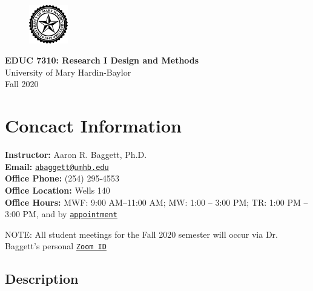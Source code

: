 \documentclass[
]{article}
\author{}
\date{\vspace{-2.5em}}
\begin{document}
\makeatletter
\setlength{\@fptop}{0pt}
\makeatother

\begin{figure}[t!]
  \centering
  \includegraphics[keepaspectratio, width=0.15\textwidth]{./Figs/Seal-Black}
\end{figure}


\begin{center}
{\LARGE{\bf{EDUC 7310: Research I Design and Methods}}}\\
{\small{University of Mary Hardin-Baylor}}\\
\vspace{.15in}
{\large{Fall 2020}}
\end{center}

\thispagestyle{empty}

\vspace{3mm}

\vspace{.25in}

\section{Concact Information}

\textbf{Instructor:} Aaron R. Baggett, Ph.D.\\
\textbf{Email:}
\texttt{\href{mailto:abaggett@umhb.edu}{abaggett@umhb.edu}}\\
\textbf{Office Phone:} (254) 295-4553\\
\textbf{Office Location:} Wells 140\\
\textbf{Office Hours:} MWF: 9:00 AM--11:00 AM; MW: 1:00 -- 3:00 PM; TR:
1:00 PM -- 3:00 PM, and by
\texttt{\href{mailto:abaggett@umhb.edu}{appointment}}

\begin{tcolorbox}
[width=\linewidth, sharp corners=all, colback=white!95!red]
NOTE: All student meetings for the Fall 2020 semester will occur via Dr. Baggett's personal \texttt{\href{https://umhb.zoom.us/j/5393191651}{Zoom ID}}
\end{tcolorbox}

\subsection{Description}
\end{document}
